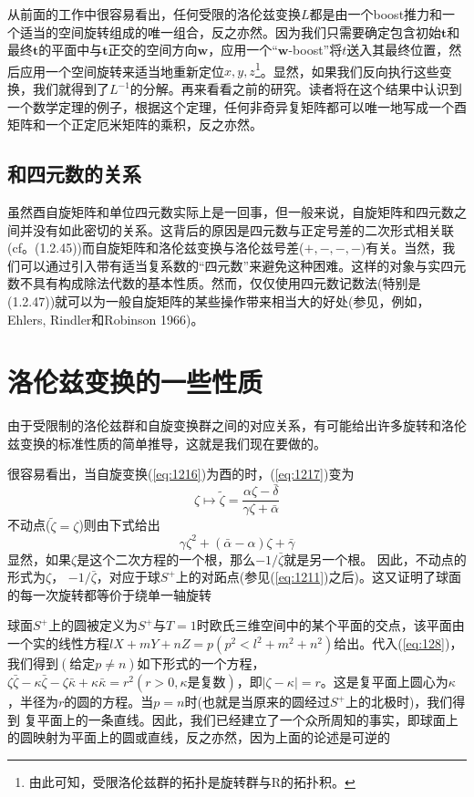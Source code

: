 \documentclass[utf8]{ctexbook}
\numberwithin{equation}{section}
\begin{document}
从前面的工作中很容易看出，任何受限的洛伦兹变换$L$都是由一个boost推力和一个适当的空间旋转组成的唯一组合，反之亦然。因为我们只需要确定包含初始$\mathbf{t}$和最终$\mathbf{t}$的平面中与$\mathbf{t}$正交的空间方向$\mathbf{w}$，应用一个“$\mathbf{w}$-boost”将$t$送入其最终位置，然后应用一个空间旋转来适当地重新定位$x, y,z$\footnote{由此可知，受限洛伦兹群的拓扑是旋转群与R的拓扑积。}。显然，如果我们反向执行这些变换，我们就得到了$L^{-1}$的分解。再来看看之前的研究。读者将在这个结果中认识到一个数学定理的例子，根据这个定理，任何非奇异复矩阵都可以唯一地写成一个酉矩阵和一个正定厄米矩阵的乘积，反之亦然。
\subsection*{和四元数的关系}
虽然酉自旋矩阵和单位四元数实际上是一回事，但一般来说，自旋矩阵和四元数之间并没有如此密切的关系。这背后的原因是四元数与正定号差的二次形式相关联(cf。(1.2.45))而自旋矩阵和洛伦兹变换与洛伦兹号差($+,-,-,-)$有关。当然，我们可以通过引入带有适当复系数的“四元数”来避免这种困难。这样的对象与实四元数不具有构成除法代数的基本性质。然而，仅仅使用四元数记数法(特别是(1.2.47))就可以为一般自旋矩阵的某些操作带来相当大的好处(参见，例如，Ehlers, Rindler和Robinson 1966)。
\section{洛伦兹变换的一些性质}\label{sec.1.3}
由于受限制的洛伦兹群和自旋变换群之间的对应关系，有可能给出许多旋转和洛伦兹变换的标准性质的简单推导，这就是我们现在要做的。

很容易看出，当自旋变换(\ref{eq:1216})为酉的时，(\ref{eq:1217})变为
\begin{equation}
    \zeta \mapsto \tilde{\zeta}=\frac{\alpha\zeta -\bar{\delta}}{\gamma\zeta +\bar{\alpha}}\label{eq:131}
\end{equation}
不动点($\tilde{\zeta}=\zeta$)则由下式给出
\begin{equation*}
    \gamma\zeta^2+(\bar{\alpha}-\alpha)\zeta+\bar{\gamma}
\end{equation*}
显然，如果$\zeta $是这个二次方程的一个根，那么$-1/\bar{\zeta}$就是另一个根。
因此，不动点的形式为$\zeta $， $-1/\bar{\zeta}$，对应于球$S^+$上的对跖点(参见(\ref{eq:1211})之后)。这又证明了球面的每一次旋转都等价于绕单一轴旋转

球面$S^+$上的圆被定义为$S^+$与$T= 1$时欧氏三维空间中的某个平面的交点，该平面由一个实的线性方程$lX+mY+ nZ=p(p^2 < l^2+ m^2 + n^2)$给出。代入(\ref{eq:128})，我们得到$(\text{给定}p\neq n)$如下形式的一个方程，$\zeta\bar{\zeta}-\kappa\bar{\zeta}-\zeta\bar{\kappa}+ \kappa\bar{\kappa}=r^2 (r>0, \kappa\text{是复数})$，即$|\zeta-\kappa|=r$。这是复平面上圆心为$\kappa $，半径为$r$的圆的方程。当$p=n$时(也就是当原来的圆经过$S^+$上的北极时)，我们得到
复平面上的一条直线。因此，我们已经建立了一个众所周知的事实，即球面上的圆映射为平面上的圆或直线，反之亦然，因为上面的论述是可逆的
\end{document}
